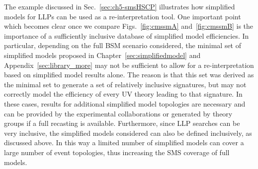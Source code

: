 The example discussed in Sec.~\ref{sec:ch5-smsHSCP} illustrates how simplified
models for LLPs can be used as a re-interpretation tool. One important
point which becomes clear once we compare Figs.~\ref{fig:cmssmA} and~\ref{fig:cmssmB} 
is the importance of a sufficiently inclusive database of simplified 
model efficiencies. In particular, depending on the full BSM scenario considered,
the minimal set of simplified models proposed in Chapter~\ref{sec:simplifiedmodel} and 
Appendix~\ref{sec:library_more} may not be sufficient to allow for a re-interpretation 
based on simplified model results alone. The reason is that this set was derived as the minimal
set to generate a set of relatively inclusive signatures, but may not correctly model
the efficiency of every UV theory leading to that signature. In these cases, results for additional simplified 
model topologies are necessary and can be provided by the experimental collaborations or 
generated by theory groups if a full recasting is available.
Furthermore, since LLP searches can be very inclusive,
the simplified models considered can also be defined inclusively,
as discussed above. In this way a limited number of simplified models
can cover a large number of event topologies, thus increasing the
SMS coverage of full models.



